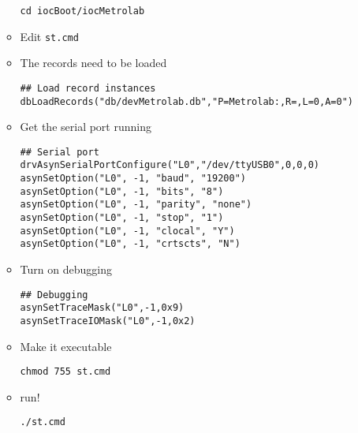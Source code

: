 \documentclass[11pt]{article}
\begin{document}
\begin{enumerate}
\begin{itemize}
\begin{verbatim}
cd iocBoot/iocMetrolab
\end{verbatim}
\item Edit \verb~st.cmd~
\item The records need to be loaded
\begin{verbatim}
## Load record instances
dbLoadRecords("db/devMetrolab.db","P=Metrolab:,R=,L=0,A=0")
\end{verbatim}
\item Get the serial port running
\begin{verbatim}
## Serial port
drvAsynSerialPortConfigure("L0","/dev/ttyUSB0",0,0,0) 
asynSetOption("L0", -1, "baud", "19200") 
asynSetOption("L0", -1, "bits", "8") 
asynSetOption("L0", -1, "parity", "none") 
asynSetOption("L0", -1, "stop", "1") 
asynSetOption("L0", -1, "clocal", "Y") 
asynSetOption("L0", -1, "crtscts", "N")
\end{verbatim}
\item Turn on debugging
\begin{verbatim}
## Debugging
asynSetTraceMask("L0",-1,0x9) 
asynSetTraceIOMask("L0",-1,0x2)
\end{verbatim}
\item Make it executable
\begin{verbatim}
chmod 755 st.cmd
\end{verbatim}
\item run!
\begin{verbatim}
./st.cmd
\end{verbatim}
\end{itemize}
\end{enumerate}
\end{document}
